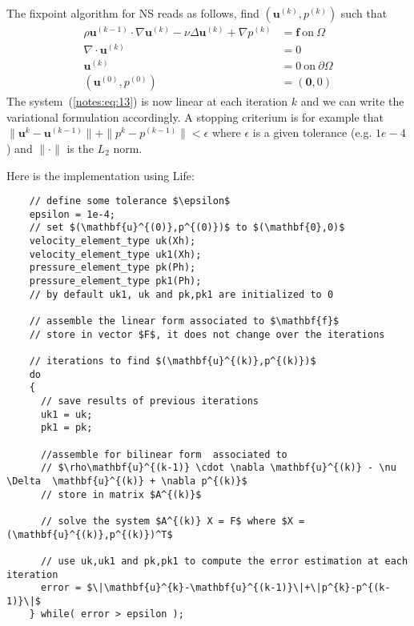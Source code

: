 The fixpoint algorithm for NS reads as follows, find
$(\mathbf{u}^{(k)},p^{(k)})$ such that
    \begin{equation}
      \label{notes:eq:13}
    \begin{split}
      \rho\mathbf{u}^{(k-1)} \cdot \nabla \mathbf{u}^{(k)} - \nu \Delta  \mathbf{u}^{(k)} + \nabla p^{(k)} &= \mathbf{f} \ \text{on}\ \Omega \\
      \nabla \cdot \mathbf{u}^{(k)} &= 0 \\
      \mathbf{u}^{(k)} &= 0\ \text{on}\ \partial \Omega\\
      (\mathbf{u}^{(0)},p^{(0)}) &= (\mathbf{0},0)
    \end{split}
  \end{equation}
  The system~(\ref{notes:eq:13}) is now linear at each iteration $k$ and we
  can write the variational formulation accordingly. A stopping
  criterium is for example that
  $\|\mathbf{u}^{k}-\mathbf{u}^{(k-1)}\|+\|p^{k}-p^{(k-1)}\| <
  \epsilon$ where $\epsilon$ is a given tolerance (e.g. $1e-4$) and
  $\|\cdot\|$ is the $L_2$ norm.

  Here is the implementation using Life:

  \begin{lstlisting}
    // define some tolerance $\epsilon$
    epsilon = 1e-4;
    // set $(\mathbf{u}^{(0)},p^{(0)})$ to $(\mathbf{0},0)$
    velocity_element_type uk(Xh);
    velocity_element_type uk1(Xh);
    pressure_element_type pk(Ph);
    pressure_element_type pk1(Ph);
    // by default uk1, uk and pk,pk1 are initialized to 0

    // assemble the linear form associated to $\mathbf{f}$
    // store in vector $F$, it does not change over the iterations

    // iterations to find $(\mathbf{u}^{(k)},p^{(k)})$
    do
    {
      // save results of previous iterations
      uk1 = uk;
      pk1 = pk;

      //assemble for bilinear form  associated to
      // $\rho\mathbf{u}^{(k-1)} \cdot \nabla \mathbf{u}^{(k)} - \nu \Delta  \mathbf{u}^{(k)} + \nabla p^{(k)}$
      // store in matrix $A^{(k)}$

      // solve the system $A^{(k)} X = F$ where $X = (\mathbf{u}^{(k)},p^{(k)})^T$

      // use uk,uk1 and pk,pk1 to compute the error estimation at each iteration
      error = $\|\mathbf{u}^{k}-\mathbf{u}^{(k-1)}\|+\|p^{k}-p^{(k-1)}\|$
    } while( error > epsilon );

  \end{lstlisting}

